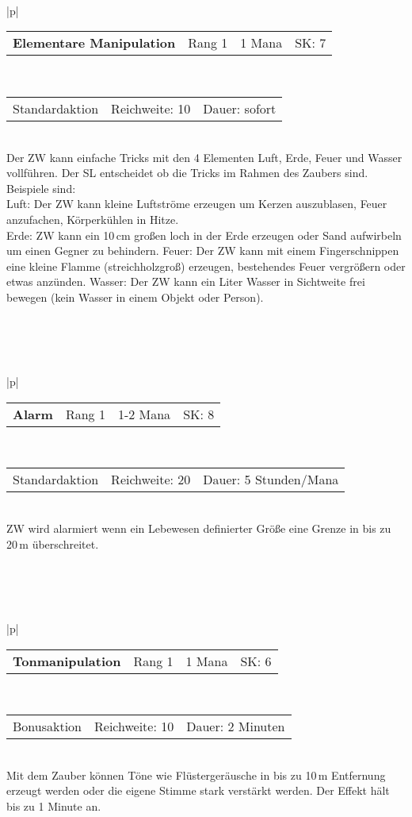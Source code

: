 \documentclass[../../Heldenanleitung2]{subfiles}
\begin{document}
\\\\\\
\begin{tabular}{|p{\textwidth}|}
\hline
\begin{tabularx}{\textwidth}{X|X|X|X}
\textbf{Elementare Manipulation} & Rang 1 & 1 Mana & SK: 7
\end{tabularx} \\ \hline
\begin{tabularx}{\textwidth}{X|X|X}
Standardaktion & Reichweite: 10 & Dauer: sofort
\end{tabularx} \\ \hline
Der ZW kann einfache Tricks mit den 4 Elementen Luft, Erde, Feuer und Wasser vollführen. Der SL entscheidet ob die Tricks im Rahmen des Zaubers sind. Beispiele sind:\\
Luft: Der ZW kann kleine Luftströme erzeugen um Kerzen auszublasen, Feuer anzufachen, Körperkühlen in Hitze.\\
Erde: ZW kann ein 10\,cm großen loch in der Erde erzeugen oder Sand aufwirbeln um einen Gegner zu behindern.
Feuer: Der ZW kann mit einem Fingerschnippen eine kleine Flamme (streichholzgroß) erzeugen, bestehendes Feuer vergrößern oder etwas anzünden.
Wasser: Der ZW kann ein Liter Wasser in Sichtweite frei bewegen (kein Wasser in einem Objekt oder Person).
\\ \hline
\end{tabular}
\\\\\\
\begin{tabular}{|p{\textwidth}|}
\hline
\begin{tabularx}{\textwidth}{X|X|X|X}
\textbf{Alarm} & Rang 1 & 1-2 Mana & SK: 8
\end{tabularx} \\ \hline
\begin{tabularx}{\textwidth}{X|X|X}
Standardaktion & Reichweite: 20 & Dauer: 5 Stunden/Mana
\end{tabularx} \\ \hline
ZW wird alarmiert wenn ein Lebewesen definierter Größe eine Grenze in bis zu 20\,m überschreitet.
\\ \hline
\end{tabular}
\\\\\\
\begin{tabular}{|p{\textwidth}|}
\hline
\begin{tabularx}{\textwidth}{X|X|X|X}
\textbf{Tonmanipulation} & Rang 1 & 1 Mana & SK: 6
\end{tabularx} \\ \hline
\begin{tabularx}{\textwidth}{X|X|X}
Bonusaktion & Reichweite: 10 & Dauer: 2 Minuten
\end{tabularx} \\ \hline
Mit dem Zauber können Töne wie Flüstergeräusche in bis zu 10\,m Entfernung erzeugt werden oder die eigene Stimme stark verstärkt werden. Der Effekt hält bis zu 1 Minute an.
\\ \hline
\end{tabular}
\end{document}
